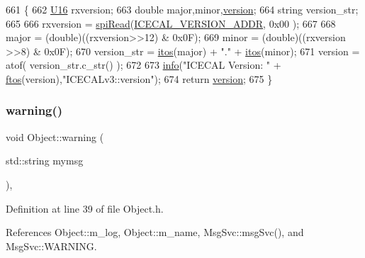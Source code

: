 \begin{DoxyCode}
661 \{
662     \hyperlink{ICECALv3_8h_adf928e51a60dba0df29d615401cc55a8}{U16} rxversion;
663     \textcolor{keywordtype}{double} major,minor,\hyperlink{classICECALv3_a7f3f8012d2e5c45f8e43819befa3f915}{version};
664     \textcolor{keywordtype}{string} version\_str;
665 
666     rxversion = \hyperlink{classICECALv3_aced41ce20a0853d6248b8df88412e57a}{spiRead}(\hyperlink{ICECALv3_8h_a46a6446285e0e7808feebc4bc9ef52e1}{ICECAL\_VERSION\_ADDR}, 0x00 );
667 
668     major = (double)((rxversion>>12) & 0x0F); 
669     minor = (double)((rxversion >>8) & 0x0F);
670     version\_str = \hyperlink{Tools_8h_af330027dbdafb9a30768b3613c553e60}{itos}(major) + \textcolor{stringliteral}{"."} + \hyperlink{Tools_8h_af330027dbdafb9a30768b3613c553e60}{itos}(minor);
671     version = atof( version\_str.c\_str() );
672 
673     \hyperlink{classObject_a644fd329ea4cb85f54fa6846484b84a8}{info}(\textcolor{stringliteral}{"ICECAL Version: "} + \hyperlink{Tools_8h_ae78000c70889d75d67813c6cb83010a6}{ftos}(version),\textcolor{stringliteral}{"ICECALv3::version"});
674     \textcolor{keywordflow}{return} \hyperlink{classICECALv3_a7f3f8012d2e5c45f8e43819befa3f915}{version};
675 \}
\end{DoxyCode}
\mbox{\label{classObject_a65cd4fda577711660821fd2cd5a3b4c9}} 
\subsubsection{\texorpdfstring{warning()}{warning()}\hspace{0.1cm}{\footnotesize\ttfamily [1/2]}}
{\footnotesize\ttfamily void Object\+::warning (\begin{DoxyParamCaption}\item[{std\+::string}]{mymsg }\end{DoxyParamCaption})\hspace{0.3cm}{\ttfamily [inline]}, {\ttfamily [inherited]}}



Definition at line 39 of file Object.\+h.



References Object\+::m\+\_\+log, Object\+::m\+\_\+name, Msg\+Svc\+::msg\+Svc(), and Msg\+Svc\+::\+W\+A\+R\+N\+I\+NG.



